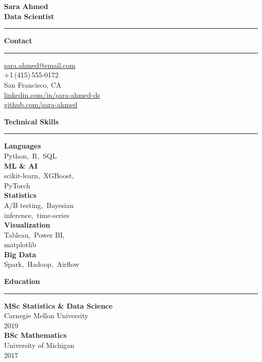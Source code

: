 \documentclass[10pt]{article}
\newlength{\sbw}\setlength{\sbw}{72mm}
\newcommand{\sideheading}[1]{%
  \vspace{4pt}%
  {\bfseries\large #1}\\[-2pt]%
  {\color{accent}\rule{\dimexpr\sbw-14mm\relax}{1.2pt}}%
  \vspace{3pt}%
}
\begin{document}
\noindent
\begin{minipage}[t]{\sbw}\color{sidetext}\vspace{10mm}\hspace{7mm}%
\begin{minipage}[t]{\dimexpr\sbw-14mm\relax}\RaggedRight

  {\bfseries\LARGE Sara Ahmed}\\[2pt]
  {\color{accent}\bfseries Data Scientist}\\[1pt]
  {\color{accent}\rule{\dimexpr\sbw-14mm\relax}{1.2pt}}

  \vspace{6pt}
  \sideheading{Contact}

  \vspace{2pt}
  \faEnvelope\enspace\href{mailto:sara.ahmed@email.com}{sara.ahmed@email.com}\\[3pt]
  \faPhone\enspace +1\,(415)\,555-0172\\[3pt]
  \faMapMarker*\enspace San Francisco, CA\\[3pt]
  \faLinkedin\enspace\href{https://linkedin.com/in/sara-ahmed-ds}{linkedin.com/in/sara-ahmed-ds}\\[3pt]
  \faGithub\enspace\href{https://github.com/sara-ahmed}{github.com/sara-ahmed}

  \vspace{4pt}
  \sideheading{Technical Skills}

  {\bfseries\small Languages}\\
  Python,\ R,\ SQL\\[3pt]

  {\bfseries\small ML \& AI}\\
  scikit-learn,\ XGBoost,\\PyTorch\\[3pt]

  {\bfseries\small Statistics}\\
  A/B testing,\ Bayesian\\inference,\ time-series\\[3pt]

  {\bfseries\small Visualization}\\
  Tableau,\ Power BI,\\matplotlib\\[3pt]

  {\bfseries\small Big Data}\\
  Spark,\ Hadoop,\ Airflow

  \vspace{4pt}
  \sideheading{Education}

  {\bfseries\small MSc Statistics \& Data Science}\\
  Carnegie Mellon University\\
  {\small 2019}\\[4pt]

  {\bfseries\small BSc Mathematics}\\
  University of Michigan\\
  {\small 2017}

\end{minipage}\end{minipage}\hfill
\end{document}

